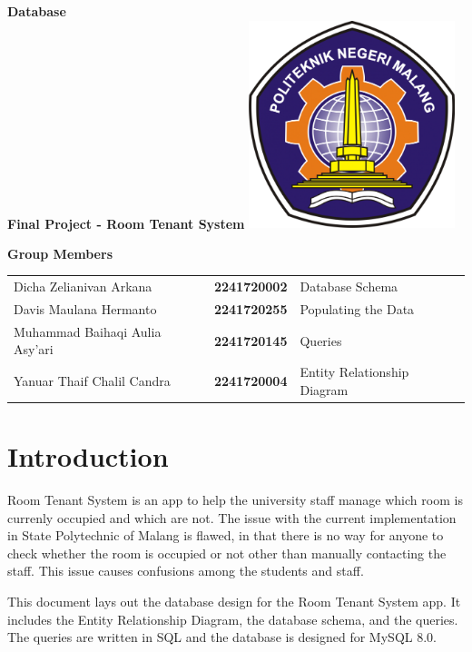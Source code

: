 \documentclass[12pt,titlepage]{article}
\newcommand{\vSubject}{Database}
\newcommand{\vSubtitle}{Final Project - Room Tenant System}
\begin{document}
\begin{titlepage}
    \centering
    \vfill
    {\bfseries\LARGE
        \vSubject\\
        \vskip0.25cm
        \vSubtitle
    }
    \vfill
    \includegraphics[width=6cm]{images/polinema-logo.png}
    \vfill
    {
        \textbf{Group Members}\\
        \vspace{1cm}
        \begin{tabular}{l l l}
            Dicha Zelianivan Arkana & \textbf{2241720002} & Database Schema \\
            Davis Maulana Hermanto & \textbf{2241720255} & Populating the Data\\
            Muhammad Baihaqi Aulia Asy'ari & \textbf{2241720145} & Queries\\
            Yanuar Thaif Chalil Candra & \textbf{2241720004} & Entity Relationship Diagram\\
        \end{tabular}
    }
\end{titlepage}

\tableofcontents

\pagebreak

\section{Introduction}
Room Tenant System is an app to help the university staff manage which room is currenly occupied and which are not.
The issue with the current implementation in State Polytechnic of Malang is flawed, in that there is no way for anyone
to check whether the room is occupied or not other than manually contacting the staff. This issue causes confusions among
the students and staff.

This document lays out the database design for the Room Tenant System app. It includes the Entity Relationship Diagram, the
database schema, and the queries. The queries are written in SQL and the database is designed for MySQL 8.0.
\end{document}
